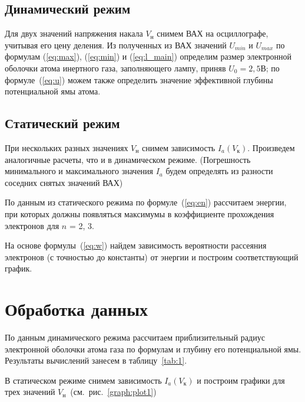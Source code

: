 \documentclass[reprint, nofootinbib, nobalancelastpage, 10pt]{revtex4-2}
\begin{document}
\subsection{Динамический режим}

Для двух значений напряжения накала $V_{\text{н}}$ снимем ВАХ на осциллографе, учитывая его
цену деления. Из полученных из ВАХ значений $U_{min}$ и $U_{max}$ по формулам (\ref{eq:max}),
(\ref{eq:min}) и (\ref{eq:l_main}) определим размер электронной оболочки атома инертного газа,
заполняющего лампу, приняв $U_0 = 2,5$В; по формуле~(\ref{eq:u}) можем также определить значение
эффективной глубины потенциальной ямы атома.

\subsection{Статический режим}

При нескольких разных значениях $V_{\text{н}}$ снимем зависимость $I_a(V_\text{к})$.
Произведем аналогичные расчеты, что и в динамическом режиме.
(Погрешность минимального и максимального значения $I_a$ будем определять из разности
соседних снятых значений ВАХ)

По данным из статического режима по формуле~(\ref{eq:en}) рассчитаем энергии, при которых
должны появляться максимумы в коэффициенте прохождения электронов для $n$ = 2, 3.

На основе формулы~(\ref{eq:w}) найдем зависимость вероятности рассеяния электронов
(с точностью до константы) от энергии и построим соответствующий график.


\section*{Обработка данных}

По данным динамического режима рассчитаем приблизительный радиус электронной оболочки атома
газа по формулам и глубину его потенциальной ямы. Результаты вычислений занесем в таблицу~\ref{tab:1}.

В статическом режиме снимем зависимость $I_a(V_\text{к})$ и построим графики для трех
значений $V_{\text{н}}$~(см.~рис.~\ref{graph:plot1})
\end{document}
